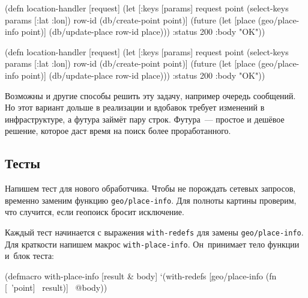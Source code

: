 \ifnarrow

\begin{english}
  \begin{clojure}
(defn location-handler
  [request]
  (let [{:keys [params]} request
        point (select-keys params
                [:lat :lon])
        row-id (db/create-point point)]
    (future
      (let [place (geo/place-info
                    point)]
        (db/update-place row-id place)))
    {:status 200 :body "OK"}))
  \end{clojure}
\end{english}

\else

\begin{english}
  \begin{clojure}
(defn location-handler
  [request]
  (let [{:keys [params]} request
        point (select-keys params [:lat :lon])
        row-id (db/create-point point)]
    (future
      (let [place (geo/place-info point)]
        (db/update-place row-id place)))
    {:status 200 :body "OK"}))
  \end{clojure}
\end{english}

\fi

Возможны и другие способы решить эту задачу, например очередь сообщений. Но этот
вариант дольше в реализации и вдобавок требует изменений в инфраструктуре, а
футура займёт пару строк. Футура~--- простое и дешёвое решение, которое даст
время на поиск более проработанного.

\subsection{Тесты}


Напишем тест для нового обработчика. Чтобы не порождать сетевых запросов,
временно заменим функцию \verb|geo/place-info|. Для полноты картины проверим,
что случится, если геопоиск бросит исключение.

Каждый тест начинается с выражения \verb|with-redefs| для замены
\verb|geo/place-info|. Для краткости напишем макрос
\texttt{with\--place\--info}. Он~принимает тело функции и~блок теста:

\begin{english}
  \begin{clojure}
(defmacro with-place-info
  [result & body]
  `(with-redefs [geo/place-info
                 (fn [~'point] ~result)]
     ~@body))
  \end{clojure}
\end{english}

